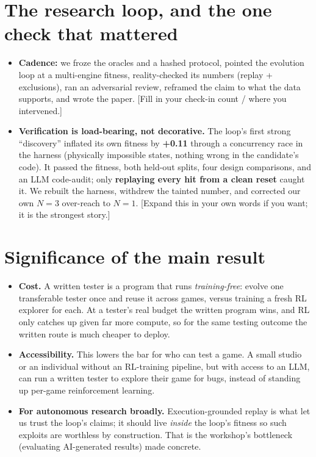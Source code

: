 \documentclass[11pt]{article}
\begin{document}
\section{The research loop, and the one check that mattered}
\label{sec:loop}
\begin{itemize}\itemsep2pt
  \item \textbf{Cadence:} we froze the oracles and a hashed protocol, pointed the evolution loop at a multi-engine
  fitness, reality-checked its numbers (replay + exclusions), ran an adversarial review, reframed the claim to what the
  data supports, and wrote the paper. [Fill in your check-in count / where you intervened.]
  \item \textbf{Verification is load-bearing, not decorative.} The loop's first strong ``discovery'' inflated its own
  fitness by \textbf{+0.11} through a concurrency race in the harness (physically impossible states, nothing wrong in the
  candidate's code). It passed the fitness, both held-out splits, four design comparisons, and an LLM code-audit; only
  \textbf{replaying every hit from a clean reset} caught it. We rebuilt the harness, withdrew the tainted number, and
  corrected our own $N{=}3$ over-reach to $N{=}1$. [Expand this in your own words if you want; it is the strongest story.]
\end{itemize}

\section{Significance of the main result}
\label{sec:significance}
\begin{itemize}\itemsep2pt
  \item \textbf{Cost.} A written tester is a program that runs \emph{training-free}: evolve one transferable tester once
  and reuse it across games, versus training a fresh RL explorer for each. At a tester's real budget the written program
  wins, and RL only catches up given far more compute, so for the same testing outcome the written route is much cheaper
  to deploy.
  \item \textbf{Accessibility.} This lowers the bar for who can test a game. A small studio or an individual without an
  RL-training pipeline, but with access to an LLM, can run a written tester to explore their game for bugs, instead of
  standing up per-game reinforcement learning.
  \item \textbf{For autonomous research broadly.} Execution-grounded replay is what let us trust the loop's claims; it
  should live \emph{inside} the loop's fitness so such exploits are worthless by construction. That is the workshop's
  bottleneck (evaluating AI-generated results) made concrete.
\end{itemize}
\end{document}
